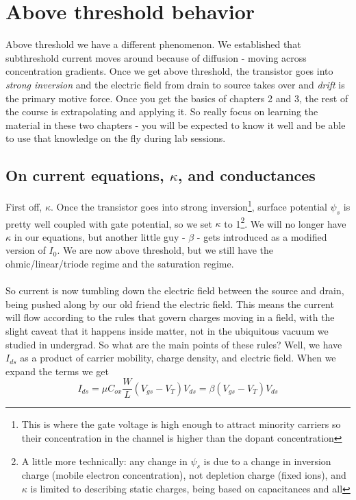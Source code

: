 \section{Above threshold behavior}
Above threshold we have a different phenomenon. We established that subthreshold current moves around because of diffusion - moving across concentration gradients. Once we get above threshold, the transistor goes into \emph{strong inversion} and the electric field from drain to source takes over and \emph{drift} is the primary motive force. Once you get the basics of chapters 2 and 3, the rest of the course is extrapolating and applying it. So really focus on learning the material in these two chapters - you will be expected to know it well and be able to use that knowledge on the fly during lab sessions.

\subsection{On current equations, $\kappa$, and conductances}
First off, $\kappa$. Once the transistor goes into strong inversion\footnote{This is where the gate voltage is high enough to attract minority carriers so their concentration in the channel is higher than the dopant concentration}, surface potential $\psi_s$ is pretty well coupled with gate potential, so we set $\kappa$ to 1\footnote{A little more technically: any change in $\psi_s$ is due to a change in inversion charge (mobile electron concentration), not depletion charge (fixed ions), and $\kappa$ is limited to describing static charges, being based on capacitances and all}. We will no longer have $\kappa$ in our equations, but another little guy - $\beta$ - gets introduced as a modified version of $I_0$. We are now above threshold, but we still have the ohmic/linear/triode regime and the saturation regime.\\ \\
So current is now tumbling down the electric field between the source and drain, being pushed along by our old friend the electric field. This means the current will flow according to the rules that govern charges moving in a field, with the slight caveat that it happens inside matter, not in the ubiquitous vacuum we studied in undergrad. So what are the main points of these rules? Well, we have $I_{ds}$ as a product of carrier mobility, charge density, and electric field. When we expand the terms we get
\begin{equation}
I_{ds} = \mu C_{ox}\frac{W}{L}(V_{gs} - V_T)V_{ds} = \beta(V_{gs} - V_T)V_{ds}
\label{abvTriodeEqn}
\end{equation}
